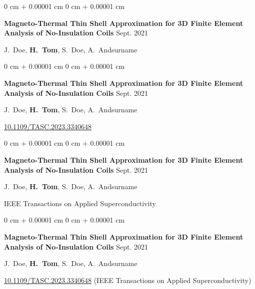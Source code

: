 \documentclass[10pt, letterpaper]{article}
\newenvironment{onecolentry}{
    \begin{adjustwidth}{
        0 cm + 0.00001 cm
    }{
        0 cm + 0.00001 cm
    }
}{
    \end{adjustwidth}
} %
\begin{document}
        
        \begin{onecolentry}
            \textbf{Magneto-Thermal Thin Shell Approximation for 3D Finite Element Analysis of No-Insulation Coils} \hfill Sept. 2021

            \vspace{0.10 cm}

            \mbox{J. Doe}, \mbox{\textbf{H. Tom}}, \mbox{S. Doe}, \mbox{A. Andsurname}
        \end{onecolentry}

        \vspace{0.1 cm}

        \begin{onecolentry}
            \textbf{Magneto-Thermal Thin Shell Approximation for 3D Finite Element Analysis of No-Insulation Coils} \hfill Sept. 2021

            \vspace{0.10 cm}

            \mbox{J. Doe}, \mbox{\textbf{H. Tom}}, \mbox{S. Doe}, \mbox{A. Andsurname}
            \vspace{0.10 cm}

        \href{https://doi.org/10.1109/TASC.2023.3340648}{10.1109/TASC.2023.3340648}\end{onecolentry}

        \vspace{0.1 cm}

        \begin{onecolentry}
            \textbf{Magneto-Thermal Thin Shell Approximation for 3D Finite Element Analysis of No-Insulation Coils} \hfill Sept. 2021

            \vspace{0.10 cm}

            \mbox{J. Doe}, \mbox{\textbf{H. Tom}}, \mbox{S. Doe}, \mbox{A. Andsurname}
            \vspace{0.10 cm}

        IEEE Transactions on Applied Superconductivity\end{onecolentry}

        \vspace{0.1 cm}

        \begin{onecolentry}
            \textbf{Magneto-Thermal Thin Shell Approximation for 3D Finite Element Analysis of No-Insulation Coils} \hfill Sept. 2021

            \vspace{0.10 cm}

            \mbox{J. Doe}, \mbox{\textbf{H. Tom}}, \mbox{S. Doe}, \mbox{A. Andsurname}
            \vspace{0.10 cm}

        \href{https://doi.org/10.1109/TASC.2023.3340648}{10.1109/TASC.2023.3340648} (IEEE Transactions on Applied Superconductivity)\end{onecolentry}
\end{document}
